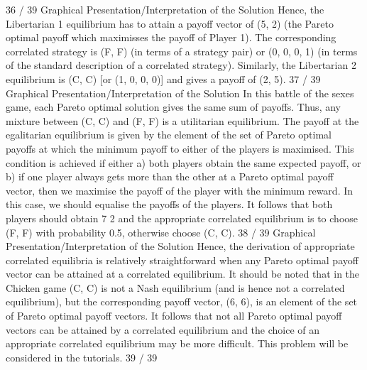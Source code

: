 36 / 39
Graphical Presentation/Interpretation of the Solution
Hence, the Libertarian 1 equilibrium has to attain a payoff vector
of (5, 2) (the Pareto optimal payoff which maximisses the payoff of
Player 1). The corresponding correlated strategy is (F, F) (in
terms of a strategy pair) or (0, 0, 0, 1) (in terms of the standard
description of a correlated strategy).
Similarly, the Libertarian 2 equilibrium is (C, C) [or (1, 0, 0, 0)] and
gives a payoff of (2, 5).
37 / 39
Graphical Presentation/Interpretation of the Solution
In this battle of the sexes game, each Pareto optimal solution gives
the same sum of payoffs. Thus, any mixture between (C, C) and
(F, F) is a utilitarian equilibrium.
The payoff at the egalitarian equilibrium is given by the element of
the set of Pareto optimal payoffs at which the minimum payoff to
either of the players is maximised.
This condition is achieved if either a) both players obtain the same
expected payoff, or b) if one player always gets more than the
other at a Pareto optimal payoff vector, then we maximise the
payoff of the player with the minimum reward.
In this case, we should equalise the payoffs of the players. It
follows that both players should obtain 7
2
and the appropriate
correlated equilibrium is to choose (F, F) with probability 0.5,
otherwise choose (C, C).
38 / 39
Graphical Presentation/Interpretation of the Solution
Hence, the derivation of appropriate correlated equilibria is
relatively straightforward when any Pareto optimal payoff vector
can be attained at a correlated equilibrium.
It should be noted that in the Chicken game (C, C) is not a Nash
equilibrium (and is hence not a correlated equilibrium), but the
corresponding payoff vector, (6, 6), is an element of the set of
Pareto optimal payoff vectors.
It follows that not all Pareto optimal payoff vectors can be attained
by a correlated equilibrium and the choice of an appropriate
correlated equilibrium may be more difficult.
This problem will be considered in the tutorials.
39 / 39
